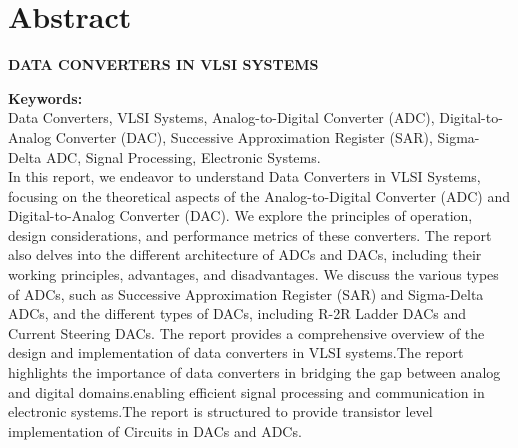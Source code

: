 \chapter*{Abstract}

\addborder
\begin{center}
	\vspace{5mm}
	\MakeUppercase{\textbf{DATA CONVERTERS IN VLSI SYSTEMS}}\\
	\vspace{5mm}
	\vspace{5mm}
	\vspace{5mm}
\end{center}

\noindent \textbf{Keywords:}\\
Data Converters, VLSI Systems, Analog-to-Digital Converter (ADC), Digital-to-Analog Converter (DAC), Successive Approximation Register (SAR), Sigma-Delta ADC, Signal Processing, Electronic Systems.
\\

In this report, we endeavor to understand Data Converters in VLSI Systems, 
focusing on the theoretical aspects of the Analog-to-Digital Converter (ADC) and Digital-to-Analog Converter (DAC).
We explore the principles of operation, design considerations, and performance metrics of these converters.
The report also delves into the different architecture of ADCs and DACs,
including their working principles, advantages, and disadvantages.
We discuss the various types of ADCs, such as Successive Approximation Register (SAR)
and Sigma-Delta ADCs, and the different types of DACs, including R-2R Ladder DACs and Current Steering DACs.
The report provides a comprehensive overview of the design and implementation of data converters in VLSI systems.The report highlights the importance of data converters in bridging the gap between analog and digital domains.enabling efficient signal processing and communication in electronic systems.The report is structured to provide transistor level implementation of Circuits in DACs and ADCs.
